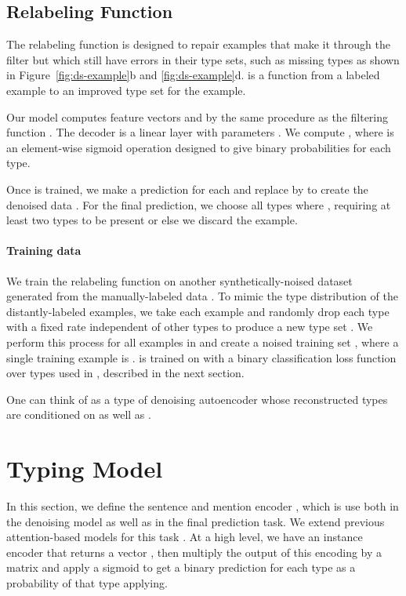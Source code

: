\documentclass[11pt,a4paper]{article}
\begin{document}
\subsection{Relabeling Function}\label{relabel}

The relabeling function  is designed to repair examples that make it through the filter but which still have errors in their type sets, such as missing types as shown in Figure~\ref{fig:ds-example}b and \ref{fig:ds-example}d.  is a function from a labeled example  to an improved type set  for the example.

Our model computes feature vectors  and  by the same procedure as the filtering function . The decoder is a linear layer with parameters . We compute , where  is an element-wise sigmoid operation designed to give binary probabilities for each type.

Once  is trained, we make a prediction  for each  and replace  by  to create the denoised data . For the final prediction, we choose all types  where , requiring at least two types to be present or else we discard the example.

\vspace{-4pt}
\paragraph{Training data} We train the relabeling function  on another synthetically-noised dataset  generated from the manually-labeled data . To mimic the type distribution of the distantly-labeled examples, we take each example  and randomly drop each type with a fixed rate  independent of other types to produce a new type set . We perform this process for all examples in  and create a noised training set , where a single training example is .  is trained on  with a binary classification loss function over types used in \citet{Eunsol_Choi_18}, described in the next section.

One can think of  as a type of denoising autoencoder \cite{Pascal_Vincent_08} whose reconstructed types  are conditioned on  as well as .




\section{Typing Model}\label{model_details}

In this section, we define the sentence and mention encoder , which is use both in the denoising model as well as in the final prediction task. We extend previous attention-based models for this task \cite{Sonse_Shimaoka_17,Eunsol_Choi_18}. At a high level, we have an instance encoder  that returns a vector , then multiply the output of this encoding by a matrix and apply a sigmoid to get a binary prediction for each type as a probability of that type applying.
\end{document}
